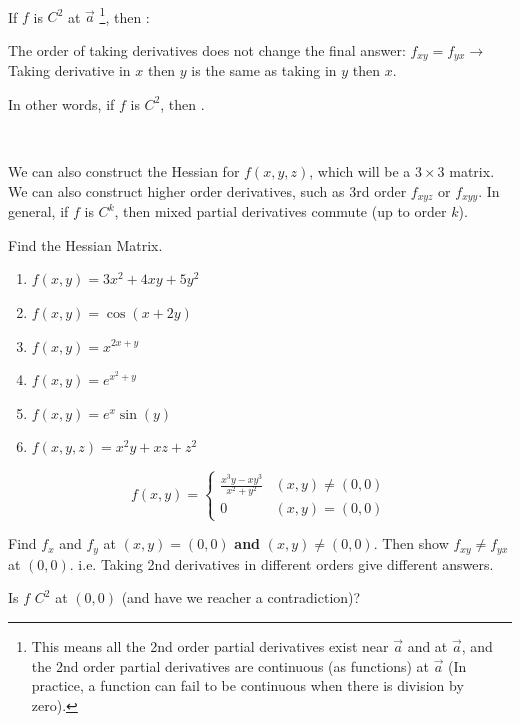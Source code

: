 \documentclass[11pt,fleqn]{book} %
\begin{document}
{~~~}

If $f$ is $C^2$ at $\vec{a}$ \footnote{This means all the 2nd order partial derivatives exist near $\vec{a}$ and at $\vec{a}$, and the 2nd order partial derivatives are continuous (as functions) at $\vec{a}$ (In practice, a function can fail to be continuous when there is division by zero). }, then :

The order of taking derivatives does not change the final answer: $f_{xy} = f_{yx} \to$ Taking derivative in $x$ then $y$ is the same as taking in $y$ then $x$.

In other words, if $f$ is $C^2$, then .

{~~~}

We can also construct the Hessian for $f(x, y, z)$, which will be a $3 \times 3$ matrix. We can also construct higher order derivatives, such as 3rd order $f_{xyz}$ or $f_{xyy}$. In general, if $f$ is $C^k$, then mixed partial derivatives commute (up to order $k$).

\begin{exercise}
    Find the Hessian Matrix.

    \begin{minipage}[t]{0.45\linewidth} 
        \begin{enumerate}
            \item $f(x, y) = 3x^2 + 4xy + 5y^2$
            \item $f(x, y) = \cos(x + 2y)$
            \item $f(x, y) = x^{2x + y}$
        \end{enumerate}
    \end{minipage}
    \begin{minipage}[t]{0.45\linewidth} 
        \begin{enumerate} \setcounter{enumi}{3}
            \item $f(x, y) = e^{x^2 + y}$
            \item $f(x, y) = e^x \sin(y)$
            \item $f(x, y, z) = x^2y + xz + z^2$
        \end{enumerate}
    \end{minipage}
\end{exercise}

\begin{exercise}
    $$f(x, y) = \begin{cases}
        \frac{x^3y - xy^3}{x^2 + y^2} & (x, y) \neq (0, 0) \\
        0                             & (x, y) = (0, 0)
    \end{cases}$$

    Find $f_x$ and $f_y$ at $(x, y) = (0, 0)$ \textbf{and} $(x, y) \neq (0, 0)$. Then show $f_{xy} \neq f_{yx}$ at $(0, 0)$. i.e. Taking 2nd derivatives in different orders give different answers. 

    Is $f$ $C^2$ at $(0, 0)$ (and have we reacher a contradiction)?
\end{exercise}
\end{document}
